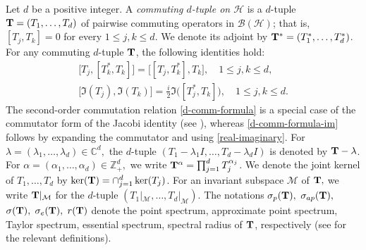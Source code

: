 \documentclass[10pt, a4paper, oneside, reqno]{amsproc}
\numberwithin{equation}{section}
\theoremstyle{remark}
\theoremstyle{definition}
\newcommand*{\Le}{\leqslant}
\begin{document}
Let $d$ be a positive integer. A {\it commuting $d$-tuple on $\mathcal H$} is a $d$-tuple ${\bf T}=(T_1,\ldots,T_d)$ of pairwise commuting operators in $\mathcal B(\mathcal H)$; that is, $[T_j, T_k]=0$ for every $1 \Le j, k \Le d$. We denote its adjoint by ${\bf T}^*=(T^*_1, \ldots, T^*_d)$. For any commuting $d$-tuple ${\bf T}$, the following identities hold:
\begin{align}
\label{d-comm-formula}
 \big[T_j, [T^*_k, T_k]\big] = \big[[T_j, T^*_k], T_k\big],
\quad 1 \Le j, k \Le d, \\
\label{d-comm-formula-im}
 \big[\Im (T_j), \Im (T_k)\big] =\frac{i}{2}\Im\big([T^*_j, T_k]\big), 
\quad 1 \Le j, k \Le d.
\end{align}
The second-order commutation relation \eqref{d-comm-formula} is a special case of the commutator form of the Jacobi identity (see \cite[Theorem~1.1.4]{DK2000}), whereas \eqref{d-comm-formula-im} follows by expanding the commutator and using \eqref{real-imaginary}. For $\lambda=(\lambda_1, \ldots, \lambda_d) \in \mathbb C^d,$ the $d$-tuple $(T_1-\lambda_1 I, \ldots, T_d-\lambda_d I)$ is denoted by ${\bf T}-\lambda$. For $\alpha =(\alpha_1, \ldots, \alpha_d) \in \mathbb Z^d_+,$  we write ${\bf T}^{\alpha}=\prod_{j=1}^d T^{\alpha_j}_j$. We denote the joint kernel of $T_1, \ldots, T_d$ by $\ker({\bf T})=\cap_{j=1}^d \ker(T_j)$. For an invariant subspace $\mathcal M$ of ${\bf T},$ we write ${\bf T}|_{\mathcal M}$ for the $d$-tuple $(T_1|_{\mathcal M}, \ldots, T_d|_{\mathcal M})$. The notations $\sigma_p({\bf T}),$ $\sigma_{ap}({\bf T}),$ $\sigma({\bf T}),$ $\sigma_e({\bf T}),$ $r({\bf T})$ denote the point spectrum, approximate point spectrum, Taylor spectrum, essential spectrum, spectral radius of ${\bf T}$, respectively (see \cite{B1971, Cu1981, T1970} for the relevant definitions). 
\end{document}
